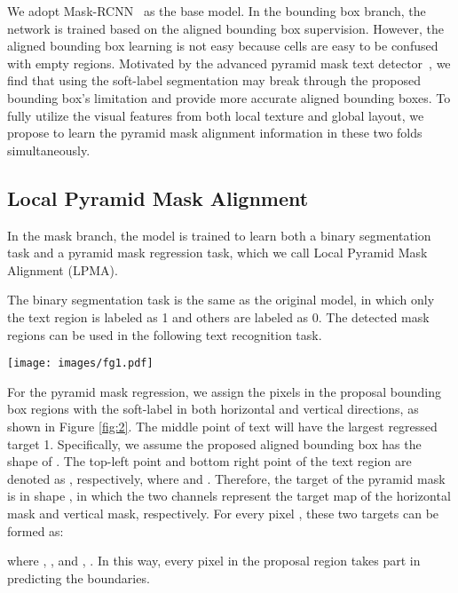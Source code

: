\documentclass[runningheads]{llncs}
\begin{document}
We adopt Mask-RCNN~\cite{he2017mask} as the base model. In the bounding box branch, the network is trained based on the aligned bounding box supervision.
However, the aligned bounding box learning is not easy because cells are easy to be confused with empty regions. Motivated by the advanced pyramid mask text detector~\cite{liu2019pyramid}, we find that using the soft-label segmentation may break through the proposed bounding box's limitation and provide more accurate aligned bounding boxes.
To fully utilize the visual features from both local texture and global layout, we propose to learn the pyramid mask alignment information in these two folds simultaneously.

\subsection{Local Pyramid Mask Alignment}
In the mask branch, the model is trained to learn both a binary segmentation task and a pyramid mask regression task, which we call Local Pyramid Mask Alignment (LPMA).

The binary segmentation task is the same as the original model, in which only the text region is labeled as 1 and others are labeled as 0. The detected mask regions can be used in the following text recognition task.
\begin{figure*}[t]
\begin{center}
\texttt{[image: images/fg1.pdf]}\\
\end{center}
\caption{(a) shows the original aligned bounding box (blue) and text region box (red). (b) shows the pyramid mask labels in horizontal and vertical direction, respectively.}
\label{fig:2}
\end{figure*}

For the pyramid mask regression, we assign the pixels in the proposal bounding box regions with the soft-label in both horizontal and vertical directions, as shown in Figure \ref{fig:2}. The middle point of text will have the largest regressed target 1. Specifically, we assume the proposed aligned bounding box has the shape of . The top-left point and bottom right point of the text region are denoted as , respectively, where   and  . Therefore, the target of the pyramid mask is in shape , in which the two channels represent the target map of the horizontal mask and vertical mask, respectively. For every pixel , these two targets can be formed as:


where , , and , . In this way, every pixel in the proposal region takes part in predicting the boundaries.
\end{document}
